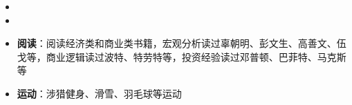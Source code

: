   \begin{itemize}[leftmargin=*]
    \item
    \item
  \end{itemize}


\begin{itemize}[leftmargin=*]
  \item \textbf{阅读}：阅读经济类和商业类书籍，宏观分析读过辜朝明、彭文生、高善文、伍戈等，商业逻辑读过波特、特劳特等，投资经验读过邓普顿、巴菲特、马克斯等
  \item \textbf{运动}：涉猎健身、滑雪、羽毛球等运动
\end{itemize}